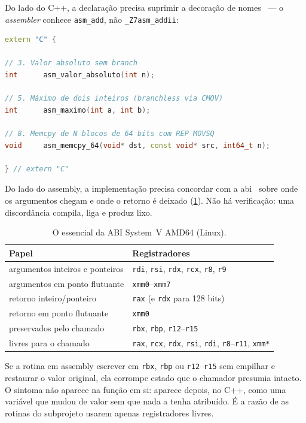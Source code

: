 Do lado do C++, a declaração precisa suprimir a decoração de
nomes~\cite{itaniumabi} --- o \emph{assembler} conhece \texttt{asm\_add}, não
\texttt{\_Z7asm\_addii}:

\begin{lstlisting}[style=bt, language=C++,
    caption={A interface, em \texttt{src/outline\_asm/asm\_funcs.hpp} (recortada).}]
extern "C" {

// 3. Valor absoluto sem branch
int      asm_valor_absoluto(int n);

// 5. Máximo de dois inteiros (branchless via CMOV)
int      asm_maximo(int a, int b);

// 8. Memcpy de N blocos de 64 bits com REP MOVSQ
void     asm_memcpy_64(void* dst, const void* src, int64_t n);

} // extern "C"
\end{lstlisting}

Do lado do assembly, a implementação precisa concordar com a
\gls{abi}~\cite{sysvabi} sobre onde os argumentos chegam e onde o retorno é
deixado (\cref{tab:sysv}). Não há verificação: uma discordância compila, liga e
produz lixo.

\begin{table}[htbp]
\centering
\caption{O essencial da ABI System~V AMD64 (Linux).}
\label{tab:sysv}
\footnotesize
\begin{tabular}{@{}ll@{}}
\toprule
\textbf{Papel} & \textbf{Registradores} \\
\midrule
argumentos inteiros e ponteiros & \texttt{rdi}, \texttt{rsi}, \texttt{rdx}, \texttt{rcx}, \texttt{r8}, \texttt{r9} \\
argumentos em ponto flutuante   & \texttt{xmm0}--\texttt{xmm7} \\
retorno inteiro/ponteiro        & \texttt{rax} (e \texttt{rdx} para 128 bits) \\
retorno em ponto flutuante      & \texttt{xmm0} \\
preservados pelo chamado        & \texttt{rbx}, \texttt{rbp}, \texttt{r12}--\texttt{r15} \\
livres para o chamado           & \texttt{rax}, \texttt{rcx}, \texttt{rdx}, \texttt{rsi}, \texttt{rdi}, \texttt{r8}--\texttt{r11}, \texttt{xmm*} \\
\bottomrule
\end{tabular}
\end{table}

\begin{armadilha}
Se a rotina em assembly escrever em \texttt{rbx}, \texttt{rbp} ou
\texttt{r12}--\texttt{r15} sem empilhar e restaurar o valor original, ela
corrompe estado que o chamador presumia intacto. O sintoma não aparece na função
em si: aparece depois, no C++, como uma variável que mudou de valor sem que
nada a tenha atribuído. É a razão de as rotinas do subprojeto usarem apenas
registradores livres.
\end{armadilha}

